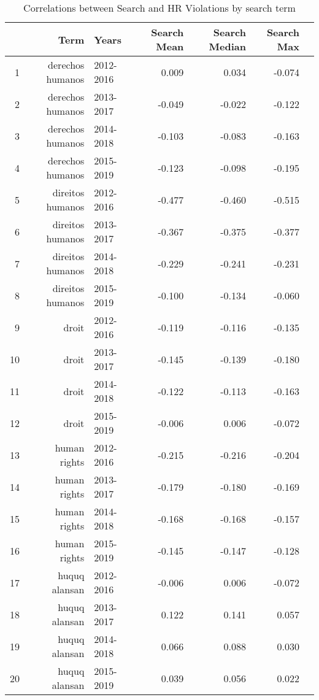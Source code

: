 \begin{table}[ht]
\centering
\begin{tabular}{|r|rlrrrr||}
  \hline
 & Term & Years & Search Mean & Search Median & Search Max \\ 
  \hline
1 & derechos humanos & 2012-2016 & 0.009 & 0.034 & -0.074 \\ 
  2 & derechos humanos & 2013-2017 & -0.049 & -0.022 & -0.122 \\ 
  3 & derechos humanos & 2014-2018 & -0.103 & -0.083 & -0.163 \\ 
  4 & derechos humanos & 2015-2019 & -0.123 & -0.098 & -0.195 \\ 
  5 & direitos humanos & 2012-2016 & -0.477 & -0.460 & -0.515 \\ 
  6 & direitos humanos & 2013-2017 & -0.367 & -0.375 & -0.377 \\ 
  7 & direitos humanos & 2014-2018 & -0.229 & -0.241 & -0.231 \\ 
  8 & direitos humanos & 2015-2019 & -0.100 & -0.134 & -0.060 \\ 
  9 & droit & 2012-2016 & -0.119 & -0.116 & -0.135 \\ 
  10 & droit & 2013-2017 & -0.145 & -0.139 & -0.180 \\ 
  11 & droit & 2014-2018 & -0.122 & -0.113 & -0.163 \\ 
  12 & droit & 2015-2019 & -0.006 & 0.006 & -0.072 \\ 
  13 & human rights & 2012-2016 & -0.215 & -0.216 & -0.204 \\ 
  14 & human rights & 2013-2017 & -0.179 & -0.180 & -0.169 \\ 
  15 & human rights & 2014-2018 & -0.168 & -0.168 & -0.157 \\ 
  16 & human rights & 2015-2019 & -0.145 & -0.147 & -0.128 \\ 
  17 & huquq alansan & 2012-2016 & -0.006 & 0.006 & -0.072 \\ 
  18 & huquq alansan & 2013-2017 & 0.122 & 0.141 & 0.057 \\ 
  19 & huquq alansan & 2014-2018 & 0.066 & 0.088 & 0.030 \\ 
  20 & huquq alansan & 2015-2019 & 0.039 & 0.056 & 0.022 \\ 
   \hline
\end{tabular}
\caption{Correlations between Search and HR Violations by search term} 
\end{table}
